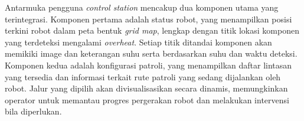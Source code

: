 Antarmuka pengguna \emph{control station} mencakup dua komponen utama yang terintegrasi. Komponen pertama adalah status robot, yang menampilkan posisi terkini robot dalam peta bentuk \emph{grid map}, lengkap dengan titik lokasi komponen yang terdeteksi mengalami \emph{overheat}. Setiap titik ditandai komponen akan memikiki image dan keterangan suhu serta berdasarkan suhu dan waktu deteksi. Komponen kedua adalah konfigurasi patroli, yang menampilkan daftar lintasan yang tersedia dan informasi terkait rute patroli yang sedang dijalankan oleh robot. Jalur yang dipilih akan divisualisasikan secara dinamis, memungkinkan operator untuk memantau progres pergerakan robot dan melakukan intervensi bila diperlukan. 